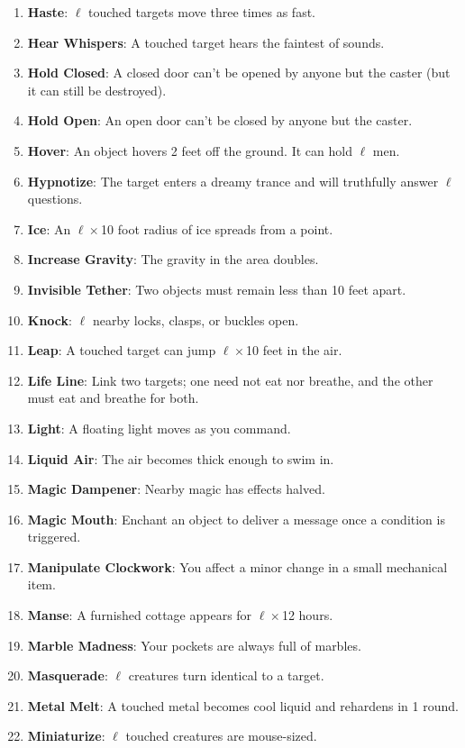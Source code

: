 \documentclass[twoside]{article}
\begin{document}
\begin{enumerate}[nosep]
\item \textbf{Haste}: $\ell$ touched targets move three times as fast.
\item \textbf{Hear Whispers}: A touched target hears the faintest of sounds.
\item \textbf{Hold Closed}: A closed door can't be opened by anyone but the caster (but it can still be destroyed).
\item \textbf{Hold Open}: An open door can't be closed by anyone but the caster.
\item \textbf{Hover}: An object hovers 2 feet off the ground. It can hold $\ell$ men.
\item \textbf{Hypnotize}: The target enters a dreamy trance and will truthfully answer $\ell$ questions. 
\item \textbf{Ice}: An $\ell\times$10 foot radius of ice spreads from a point.
\item \textbf{Increase Gravity}: The gravity in the area doubles.
\item \textbf{Invisible Tether}: Two objects must remain less than 10 feet apart.
\item \textbf{Knock}: $\ell$ nearby locks, clasps, or buckles open.
\item \textbf{Leap}: A touched target can jump $\ell\times$10 feet in the air.
\item \textbf{Life Line}: Link two targets; one need not eat nor breathe, and the other must eat and breathe for both.
\item \textbf{Light}: A floating light moves as you command.
\item \textbf{Liquid Air}: The air becomes thick enough to swim in.
\item \textbf{Magic Dampener}: Nearby magic has effects halved.
\item \textbf{Magic Mouth}: Enchant an object to deliver a message once a condition is triggered.
\item \textbf{Manipulate Clockwork}: You affect a minor change in a small mechanical item.
\item \textbf{Manse}: A furnished cottage appears for $\ell\times$12 hours.
\item \textbf{Marble Madness}: Your pockets are always full of marbles.
\item \textbf{Masquerade}: $\ell$ creatures turn identical to a target.
\item \textbf{Metal Melt}: A touched metal becomes cool liquid and rehardens in 1 round.
\item \textbf{Miniaturize}: $\ell$ touched creatures are mouse-sized.

\end{enumerate}
\end{document}
